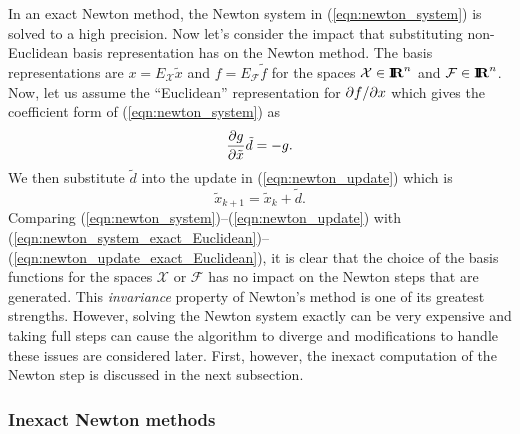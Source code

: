 In an exact Newton method, the Newton system in (\ref{eqn:newton_system}) is
solved to a high precision.  Now let's consider the impact that substituting
non-Euclidean basis representation has on the Newton method.  The basis
representations are $x = E_{\mathcal{X}}\tilde{x}$ and $f =
E_{\mathcal{F}}\tilde{f}$ for the spaces $\mathcal{X}\in\mbox{\textbf{I}}\hspace{-0.6ex}\mbox{\textbf{R}}^n$ and
$\mathcal{F}\in\mbox{\textbf{I}}\hspace{-0.6ex}\mbox{\textbf{R}}^n$.  Now, let us assume the ``Euclidean'' representation
for $\partial f / \partial x$ which gives the coefficient form of (\ref{eqn:newton_system})
as
%
\begin{equation}
\displaystyle{\frac{\partial g}{\partial \tilde{x}}} \tilde{d} =  - g.
\label{eqn:newton_system_exact_Euclidean}
\end{equation}
%
We then substitute $\tilde d$ into the update in (\ref{eqn:newton_update})
which is
%
\begin{equation}
\tilde{x}_{k+1} = \tilde{x}_k + \tilde{d}.
\label{eqn:newton_update_exact_Euclidean}
\end{equation}
%
Comparing (\ref{eqn:newton_system})--(\ref{eqn:newton_update}) with
(\ref{eqn:newton_system_exact_Euclidean})--(\ref{eqn:newton_update_exact_Euclidean}),
it is clear that the choice of the basis functions for the spaces
$\mathcal{X}$ or $\mathcal{F}$ has no impact on the Newton steps that are
generated.  This {}\textit{invariance} property of Newton's method is one of
its greatest strengths.  However, solving the Newton system exactly can be
very expensive and taking full steps can cause the algorithm to diverge and
modifications to handle these issues are considered later.  First, however,
the inexact computation of the Newton step is discussed in the next
subsection.

\subsubsection*{Inexact Newton methods}

